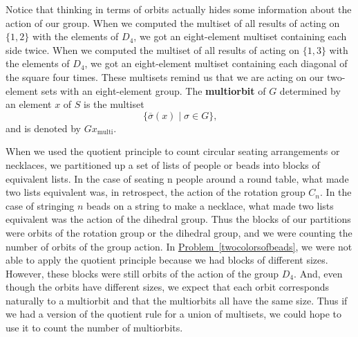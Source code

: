 \documentclass[10pt,]{book}
\newcommand{\terminology}[1]{\textbf{#1}}
\theoremstyle{plain}
\theoremstyle{definition}
\theoremstyle{definition}
\numberwithin{equation}{chapter}
\begin{document}
Notice that thinking in terms of orbits actually hides some information about the action of our group. When we computed the multiset of all results of acting on \(\{1, 2\}\) with the elements of \(D_4\), we got an eight-element multiset containing each side twice. When we computed the multiset of all results of acting on \(\{1,3\}\) with the elements of \(D_4\), we got an eight-element multiset containing each diagonal of the square four times. These multisets remind us that we are acting on our two-element sets with an eight-element group. The \terminology{multiorbit} of \(G\) determined by an element \(x\) of \(S\) is the multiset%
\begin{equation*}
\{\overline{\sigma}(x)\mid \sigma \in G\}\text{,}
\end{equation*}
and is denoted by \(Gx_{\text{multi}}\).%
\par
When we used the quotient principle to count circular seating arrangements or necklaces, we partitioned up a set of lists of people or beads into blocks of equivalent lists. In the case of seating n people around a round table, what made two lists equivalent was, in retrospect, the action of the rotation group \(C_n\). In the case of stringing \(n\) beads on a string to make a necklace, what made two lists equivalent was the action of the dihedral group. Thus the blocks of our partitions were orbits of the rotation group or the dihedral group, and we were counting the number of orbits of the group action. In \hyperref[twocolorsofbeads]{Problem~\ref{twocolorsofbeads}}, we were not able to apply the quotient principle because we had blocks of different sizes. However, these blocks were still orbits of the action of the group \(D_4\). And, even though the orbits have different sizes, we expect that each orbit corresponds naturally to a multiorbit and that the multiorbits all have the same size. Thus if we had a version of the quotient rule for a union of multisets, we could hope to use it to count the number of multiorbits.%
\end{document}
